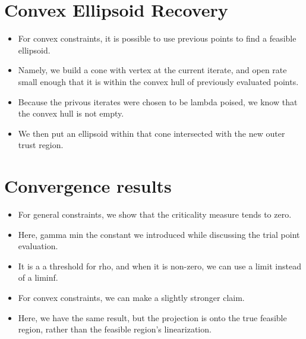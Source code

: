 \documentclass{article}
\begin{document}
	\section{Convex Ellipsoid Recovery}
\begin{itemize}
\item For convex constraints, it is possible to use previous points to find a feasible ellipsoid.
\item Namely, we build a cone with vertex at the current iterate,
and open rate small enough that it is within the convex hull of previously evaluated points.
\item Because the privous iterates were chosen to be lambda poised, we know that the convex hull is not empty.
\item We then put an ellipsoid within that cone intersected with the new outer trust region.
\end{itemize}

	\section{Convergence results}
\begin{itemize}
\item For general constraints, we show that the criticality measure tends to zero.
\item Here, gamma min the constant we introduced while discussing the trial point evaluation.
\item It is a a threshold for rho, and when it is non-zero, we can use a limit instead of a liminf.
\end{itemize}

\hrulefill

\begin{itemize}
\item For convex constraints, we can make a slightly stronger claim.
\item Here, we have the same result, but the projection is onto the true feasible region, rather than the feasible region's linearization.
\end{itemize}
\end{document}
